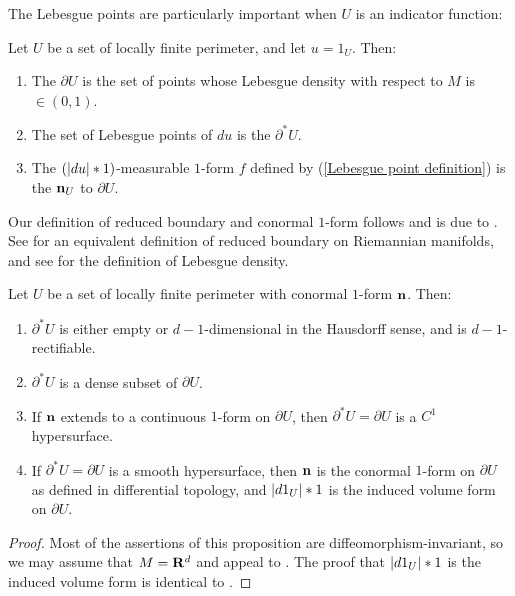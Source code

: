 The Lebesgue points are particularly important when $U$ is an indicator function:

\begin{definition}
Let $U$ be a set of locally finite perimeter, and let $u = 1_U$. Then:
\begin{enumerate}
\item The  $\partial U$ is the set of points whose Lebesgue density with respect to $M$ is $\in (0, 1)$.
\item The set of Lebesgue points of $du$ is the  $\partial^* U$.
\item The $(|du|*1)$-measurable $1$-form $f$ defined by (\ref{Lebesgue point definition}) is the  $\mathbf n_U$ to $\partial U$.
\end{enumerate}
\end{definition}

Our definition of reduced boundary and conormal $1$-form follows \cite[Definition 3.3]{Giusti77} and is due to \cite{deGiorgi55}.
See \cite{Battista_2021} for an equivalent definition of reduced boundary on Riemannian manifolds, and see \cite[Chapter 6]{Pugh02} for the definition of Lebesgue density.

\begin{proposition}\label{locality of Caccioppoli}
    Let $U$ be a set of locally finite perimeter with conormal $1$-form $\mathbf n$.
    Then:
    \begin{enumerate}
    \item $\partial^* U$ is either empty or $d-1$-dimensional in the Hausdorff sense, and is $d-1$-rectifiable.
    \item $\partial^* U$ is a dense subset of $\partial U$.
    \item If $\mathbf n$ extends to a continuous $1$-form on $\partial U$, then $\partial^* U = \partial U$ is a $C^1$ hypersurface.
    \item If $\partial^* U = \partial U$ is a smooth hypersurface, then $\mathbf n$ is the conormal $1$-form on $\partial U$ as defined in differential topology, and $|d1_U|*1$ is the induced volume form on $\partial U$.
\end{enumerate}
\end{proposition}
\begin{proof}
Most of the assertions of this proposition are diffeomorphism-invariant, so we may assume that $M = \mathbf{R}^d$ and appeal to \cite[Chapters 2-4]{Giusti77}.
The proof that $|d1_U|*1$ is the induced volume form is identical to \cite[Example 1.4]{Giusti77}.
\end{proof}

